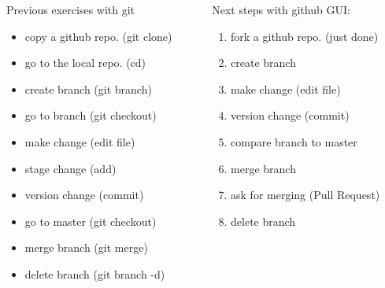 \begin{frame}{ }
\begin{columns}
\begin{column}{0.49\textwidth}
\begin{exampleblock}{Previous exercises with git}
\begin{itemize}
    \item copy a github repo. (git clone)
    \item go to the local repo. (cd)
    \item create branch (git branch)
    \item go to branch (git checkout)
    \item make change (edit file)
    \item stage change (add)
    \item version change (commit)
    \item go to master (git checkout)
    \item merge branch (git merge)
    \item delete branch (git branch -d)
\end{itemize}
\end{exampleblock}
\end{column}
\begin{column}{0.49\textwidth}
\begin{exampleblock}{Next steps with github GUI:}
\begin{enumerate}
    \item fork a github repo. (just done)
    \item create branch 
    \item make change (edit file)
    \item version change (commit)
    \item compare branch to master
    \item merge branch 
    \item ask for merging (Pull Request)
    \item delete branch
\end{enumerate}
\end{exampleblock}
\end{column}
\end{columns}
\end{frame}



